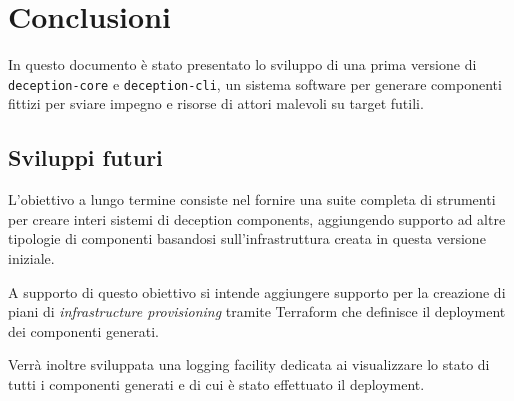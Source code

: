 \section{Conclusioni}

In questo documento è stato presentato lo sviluppo di una prima versione di \texttt{deception-core} e \texttt{deception-cli}, un sistema software per generare componenti fittizi per sviare impegno e risorse di attori malevoli su target futili.

\subsection{Sviluppi futuri}

L'obiettivo a lungo termine consiste nel fornire una suite completa di strumenti per creare interi sistemi di deception components, aggiungendo supporto ad altre tipologie di componenti basandosi sull'infrastruttura creata in questa versione iniziale.

A supporto di questo obiettivo si intende aggiungere supporto per la creazione di piani di \textit{infrastructure provisioning} tramite Terraform che definisce il deployment dei componenti generati.

Verrà inoltre sviluppata una logging facility dedicata ai visualizzare lo stato di tutti i componenti generati e di cui è stato effettuato il deployment.

